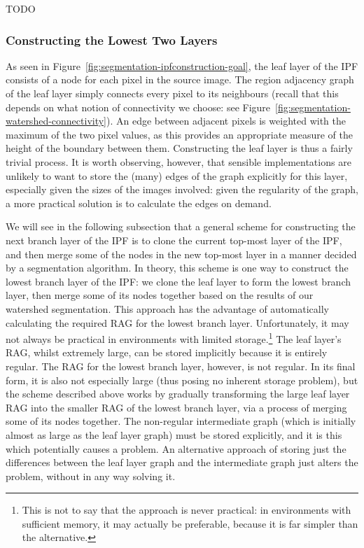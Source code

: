 TODO

\subsubsection{Constructing the Lowest Two Layers}

As seen in Figure~\ref{fig:segmentation-ipfconstruction-goal}, the leaf layer of the IPF consists of a node for each pixel in the source image. The region adjacency graph of the leaf layer simply connects every pixel to its neighbours (recall that this depends on what notion of connectivity we choose: see Figure~\ref{fig:segmentation-watershed-connectivity}). An edge between adjacent pixels is weighted with the maximum of the two pixel values, as this provides an appropriate measure of the height of the boundary between them. Constructing the leaf layer is thus a fairly trivial process. It is worth observing, however, that sensible implementations are unlikely to want to store the (many) edges of the graph explicitly for this layer, especially given the sizes of the images involved: given the regularity of the graph, a more practical solution is to calculate the edges on demand.

We will see in the following subsection that a general scheme for constructing the next branch layer of the IPF is to clone the current top-most layer of the IPF, and then merge some of the nodes in the new top-most layer in a manner decided by a segmentation algorithm. In theory, this scheme is one way to construct the lowest branch layer of the IPF: we clone the leaf layer to form the lowest branch layer, then merge some of its nodes together based on the results of our watershed segmentation. This approach has the advantage of automatically calculating the required RAG for the lowest branch layer. Unfortunately, it may not always be practical in environments with limited storage.\footnote{This is not to say that the approach is never practical: in environments with sufficient memory, it may actually be preferable, because it is far simpler than the alternative.} The leaf layer's RAG, whilst extremely large, can be stored implicitly because it is entirely regular. The RAG for the lowest branch layer, however, is not regular. In its final form, it is also not especially large (thus posing no inherent storage problem), but the scheme described above works by gradually transforming the large leaf layer RAG into the smaller RAG of the lowest branch layer, via a process of merging some of its nodes together. The non-regular intermediate graph (which is initially almost as large as the leaf layer graph) must be stored explicitly, and it is this which potentially causes a problem. An alternative approach of storing just the differences between the leaf layer graph and the intermediate graph just alters the problem, without in any way solving it.


